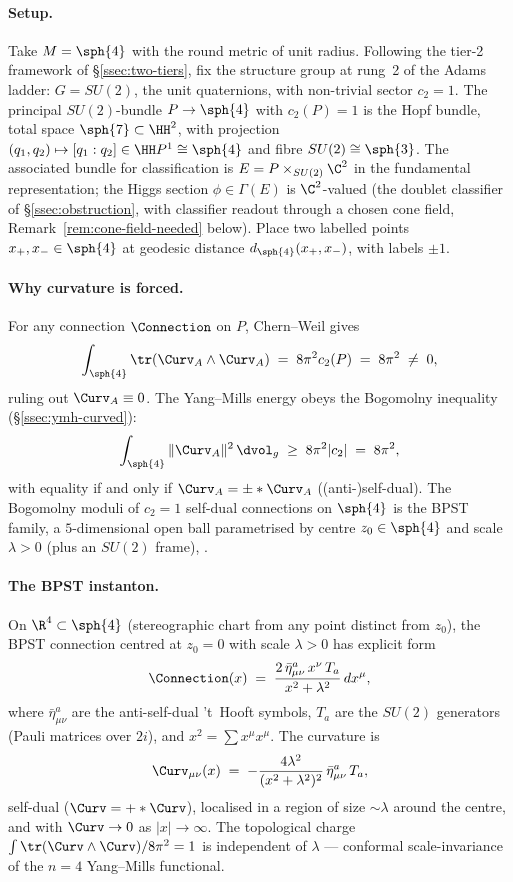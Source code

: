 \paragraph{Setup.} Take $M=\sph{4}$ with the round metric of unit
radius. Following the tier-2 framework of \S\ref{ssec:two-tiers},
fix the structure group at rung~2 of the Adams ladder: $G=SU(2)$, the
unit quaternions, with non-trivial sector $c_2=1$. The principal
$SU(2)$-bundle $P\to\sph{4}$ with $c_2(P)=1$ is the Hopf bundle, total
space $\sph{7}\subset\HH^2$, with projection
$(q_1,q_2)\mapsto[q_1:q_2]\in\HH P^1\cong\sph{4}$ and fibre
$SU(2)\cong\sph{3}$. The associated bundle for classification
is $E=P\times_{SU(2)}\C^2$ in the fundamental representation; the
Higgs section $\phi\in\Gamma(E)$ is $\C^2$-valued (the doublet
classifier of \S\ref{ssec:obstruction}, with classifier readout
through a chosen cone field, Remark~\ref{rem:cone-field-needed}
below). Place two labelled points $x_+,x_-\in\sph{4}$ at geodesic
distance $d_{\sph{4}}(x_+,x_-)$, with labels $\pm 1$.

\paragraph{Why curvature is forced.} For any connection $\Connection$
on $P$, Chern--Weil gives
\[
   \int_{\sph{4}}\tr(\Curv_A\wedge\Curv_A)
   \;=\; 8\pi^2 c_2(P) \;=\; 8\pi^2 \;\neq\; 0,
\]
ruling out $\Curv_A\equiv 0$. The Yang--Mills energy obeys the
Bogomolny inequality (\S\ref{ssec:ymh-curved}):
\[
   \int_{\sph{4}}\|\Curv_A\|^2\,\dvol_g
   \;\geq\; 8\pi^2|c_2| \;=\; 8\pi^2,
\]
with equality if and only if $\Curv_A=\pm*\Curv_A$ ((anti-)self-dual).
The Bogomolny moduli of $c_2=1$ self-dual connections on $\sph{4}$ is
the BPST family, a $5$-dimensional open ball parametrised by centre
$z_0\in\sph{4}$ and scale $\lambda>0$ (plus an $SU(2)$ frame),
\cite{Atiyah1979}.

\paragraph{The BPST instanton.} On $\R^4\subset\sph{4}$ (stereographic
chart from any point distinct from $z_0$), the BPST connection
centred at $z_0=0$ with scale $\lambda>0$ has explicit form
\[
   \Connection(x) \;=\;
   \frac{2\,\bar\eta^{a}_{\mu\nu}\,x^\nu\,T_a}{x^2 + \lambda^2}\,dx^\mu,
\]
where $\bar\eta^{a}_{\mu\nu}$ are the anti-self-dual 't~Hooft symbols,
$T_a$ are the $SU(2)$ generators (Pauli matrices over $2i$), and
$x^2=\sum x^\mu x^\mu$. The curvature is
\[
   \Curv_{\mu\nu}(x) \;=\;
   -\frac{4\lambda^2}{(x^2+\lambda^2)^2}\,\bar\eta^{a}_{\mu\nu}\,T_a,
\]
self-dual ($\Curv=+*\Curv$), localised in a region of size $\sim\lambda$
around the centre, and with $\Curv\to 0$ as $|x|\to\infty$. The
topological charge $\int\tr(\Curv\wedge\Curv)/8\pi^2=1$ is independent
of $\lambda$ --- conformal scale-invariance of the $n=4$ Yang--Mills
functional.

